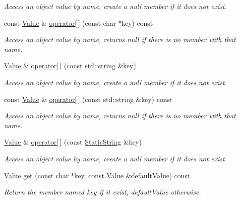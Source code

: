 \begin{DoxyCompactItemize}
\begin{DoxyCompactList}\small\item\em Access an object value by name, create a null member if it does not exist. \end{DoxyCompactList}\item 
const \hyperlink{classJson_1_1Value}{Value} \& \hyperlink{classJson_1_1Value_ace2579a4be99b4741df38a736f16d5ad}{operator\mbox{[}$\,$\mbox{]}} (const char $\ast$key) const 
\begin{DoxyCompactList}\small\item\em Access an object value by name, returns null if there is no member with that name. \end{DoxyCompactList}\item 
\hyperlink{classJson_1_1Value}{Value} \& \hyperlink{classJson_1_1Value_abe307d6088dfa1299729f795259f590e}{operator\mbox{[}$\,$\mbox{]}} (const std\-::string \&key)
\begin{DoxyCompactList}\small\item\em Access an object value by name, create a null member if it does not exist. \end{DoxyCompactList}\item 
const \hyperlink{classJson_1_1Value}{Value} \& \hyperlink{classJson_1_1Value_a3c53bfd2381d5a61036d7dc0b023d697}{operator\mbox{[}$\,$\mbox{]}} (const std\-::string \&key) const 
\begin{DoxyCompactList}\small\item\em Access an object value by name, returns null if there is no member with that name. \end{DoxyCompactList}\item 
\hyperlink{classJson_1_1Value}{Value} \& \hyperlink{classJson_1_1Value_ac191343a7ee2ca54827d67d934200d4f}{operator\mbox{[}$\,$\mbox{]}} (const \hyperlink{classJson_1_1StaticString}{Static\-String} \&key)
\begin{DoxyCompactList}\small\item\em Access an object value by name, create a null member if it does not exist. \end{DoxyCompactList}\item 
\hyperlink{classJson_1_1Value}{Value} \hyperlink{classJson_1_1Value_ab76b3323cde14c7db20676d07b260ce7}{get} (const char $\ast$key, const \hyperlink{classJson_1_1Value}{Value} \&default\-Value) const 
\begin{DoxyCompactList}\small\item\em Return the member named key if it exist, default\-Value otherwise. \end{DoxyCompactList}\item 

\end{DoxyCompactItemize}
